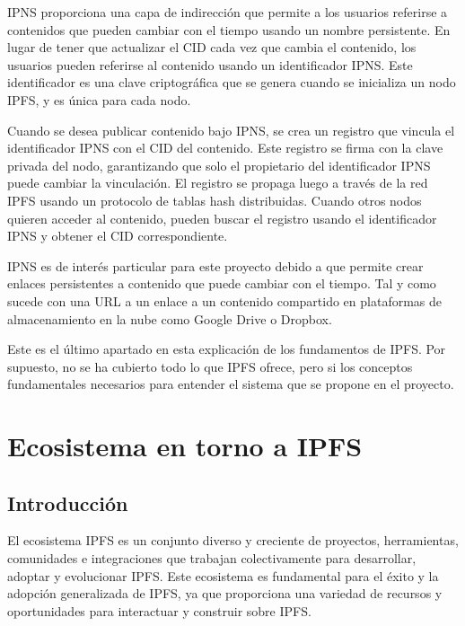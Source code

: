 IPNS proporciona una capa de indirección que permite a los usuarios referirse a contenidos que pueden cambiar con el tiempo usando un nombre persistente.
En lugar de tener que actualizar el CID cada vez que cambia el contenido, los usuarios pueden referirse al contenido usando un identificador IPNS.
Este identificador es una clave criptográfica que se genera cuando se inicializa un nodo IPFS, y es única para cada nodo.

Cuando se desea publicar contenido bajo IPNS, se crea un registro que vincula el identificador IPNS con el CID del contenido.
Este registro se firma con la clave privada del nodo, garantizando que solo el propietario del identificador IPNS puede cambiar la vinculación.
El registro se propaga luego a través de la red IPFS usando un protocolo de tablas hash distribuidas. Cuando otros nodos quieren acceder al contenido, pueden buscar el registro usando el identificador IPNS y obtener el CID correspondiente.

IPNS es de interés particular para este proyecto debido a que permite crear enlaces persistentes a contenido que puede cambiar con el tiempo.
Tal y como sucede con una URL a un enlace a un contenido compartido en plataformas de almacenamiento en la nube como Google Drive o Dropbox.

Este es el último apartado en esta explicación de los fundamentos de IPFS. Por supuesto, no se ha cubierto todo lo que IPFS ofrece, pero si los conceptos
fundamentales necesarios para entender el sistema que se propone en el proyecto.

\section{Ecosistema en torno a IPFS}\label{sect:ecosistema}
\subsection{Introducción}
El ecosistema IPFS es un conjunto diverso y creciente de proyectos, herramientas, comunidades e integraciones que trabajan colectivamente para desarrollar, adoptar y evolucionar IPFS. Este ecosistema es fundamental para el éxito y la adopción generalizada de IPFS, ya que proporciona una variedad de recursos y oportunidades para interactuar y construir sobre IPFS.

